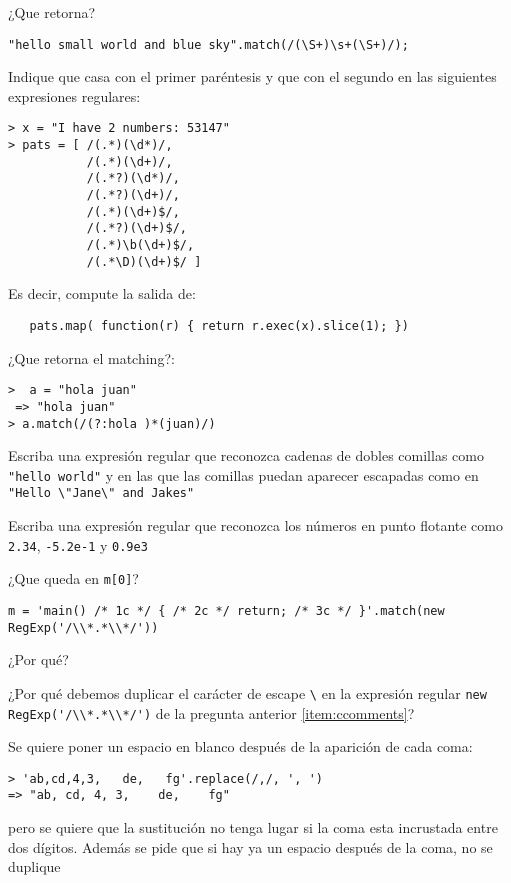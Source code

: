 
\item
¿Que retorna?
\begin{verbatim}
"hello small world and blue sky".match(/(\S+)\s+(\S+)/);
\end{verbatim}

\item
Indique que casa con el primer paréntesis y que con el segundo en las siguientes expresiones regulares:
\begin{verbatim}
> x = "I have 2 numbers: 53147"
> pats = [ /(.*)(\d*)/, 
           /(.*)(\d+)/, 
           /(.*?)(\d*)/, 
           /(.*?)(\d+)/, 
           /(.*)(\d+)$/, 
           /(.*?)(\d+)$/, 
           /(.*)\b(\d+)$/, 
           /(.*\D)(\d+)$/ ]
\end{verbatim}
Es decir, compute la salida de:
\begin{verbatim}
   pats.map( function(r) { return r.exec(x).slice(1); })
\end{verbatim}
\item
¿Que retorna el matching?:
\begin{verbatim}
>  a = "hola juan"
 => "hola juan" 
> a.match(/(?:hola )*(juan)/)
\end{verbatim}

\item 
Escriba una expresión regular que reconozca cadenas de dobles comillas como \verb|"hello world"|
y en las que las comillas puedan aparecer escapadas como en \verb|"Hello \"Jane\" and Jakes"|

\item
Escriba una expresión regular que reconozca los números en punto flotante como
\verb|2.34|, \verb|-5.2e-1| y \verb|0.9e3|

\item
\label{item:ccomments}
¿Que queda en \verb|m[0]|?
\begin{verbatim}
m = 'main() /* 1c */ { /* 2c */ return; /* 3c */ }'.match(new RegExp('/\\*.*\\*/'))
\end{verbatim}
¿Por qué?
\item 
¿Por qué debemos duplicar el carácter de escape \verb|\| en  la expresión regular \verb|new RegExp('/\\*.*\\*/')| de la pregunta anterior \ref{item:ccomments}?
\item
Se quiere poner un espacio en blanco después de la aparición de cada coma:
\begin{verbatim}
> 'ab,cd,4,3,   de,   fg'.replace(/,/, ', ')
=> "ab, cd, 4, 3,    de,    fg" 
\end{verbatim}
pero se quiere que la sustitución no tenga lugar si la coma esta incrustada entre
dos dígitos. Además se pide que si hay ya un espacio después de la coma,
no se duplique

